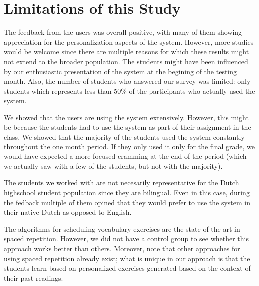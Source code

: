 
\section{Limitations of this Study}
\label{sec:limitations}

The feedback from the users was overall positive, with many of them showing appreciation for the personalization aspects of the system. However, more studies would be welcome since there are multiple reasons for which these results might not extend to the broader population. The students might have been influenced by our enthusiastic presentation of the system at the begining of the testing month. Also, the number of students who answered our survey was limited: only \surveyrespondents students which represents less than 50\% of the participants who actually used the system.

We showed that the users are using the system extensively. However, this might be because the students had to use the system as part of their assignment in the class. We showed that the majority of the students used the system constantly throughout the one month period. If they only used it only for the final grade, we would have expected a more focused cramming at the end of the period (which we actually saw with a few of the students, but not with the majority). 

The students we worked with are not necesarily representative for the Dutch highschool student population since they are bilingual. Even in this case, during the fedback multiple of them opined that they would prefer to use the system in their native Dutch as opposed to English.


The algorithms for scheduling vocabulary exercises are the state of the art in spaced repetition. However, we did not have a control group to see whether this approach works better than others. Moreover, note that other approaches for using spaced repetition already exist; what is unique in our approach is that the students learn based on personalized exercises generated based on the context of their past readings.




